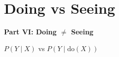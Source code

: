 \documentclass[aspectratio=169]{beamer}
\begin{document}
\section{Doing vs Seeing}

\begin{frame}
\begin{center}
  \vspace{1.5cm}
  {\Huge\bfseries\textcolor{popblue}{Part VI: Doing $\neq$ Seeing}}

  \vspace{0.8cm}
  {\large $P(Y \mid X)$ vs $P(Y \mid \text{do}(X))$}
\end{center}
\end{frame}
\end{document}
